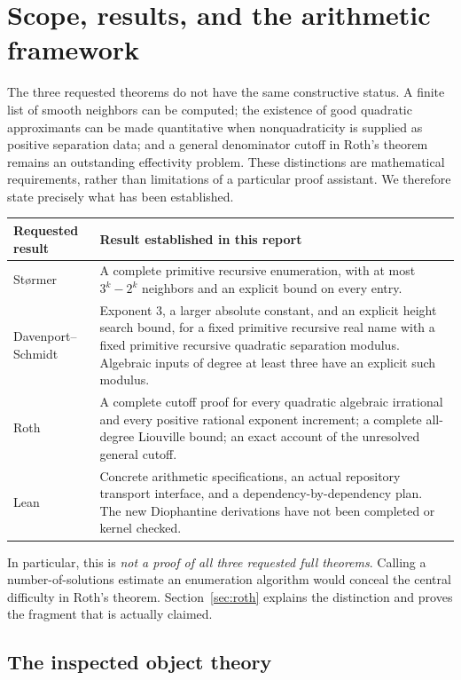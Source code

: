 \section{Scope, results, and the arithmetic framework}
\label{sec:framework}

The three requested theorems do not have the same constructive status.  A
finite list of smooth neighbors can be computed; the existence of good
quadratic approximants can be made quantitative when nonquadraticity is
supplied as positive separation data; and a general denominator cutoff in
Roth's theorem remains an outstanding effectivity problem.  These distinctions
are mathematical requirements, rather than limitations of a particular proof
assistant.  We therefore state precisely what has been established.

\begin{center}
\begin{tabularx}{\textwidth}{@{}p{}X@{}}
\toprule
Requested result & Result established in this report\\
\midrule
St\o rmer & A complete primitive recursive enumeration, with at most
$3^k-2^k$ neighbors and an explicit bound on every entry.\\[3pt]
Davenport--Schmidt & Exponent $3$, a larger absolute constant, and an
explicit height search bound, for a fixed primitive recursive real name
with a fixed primitive recursive quadratic separation modulus.
Algebraic inputs of degree at least three have an explicit such modulus.\\[3pt]
Roth & A complete cutoff proof for every quadratic algebraic irrational
and every positive rational exponent increment; a complete all-degree
Liouville bound; an exact account of the unresolved general cutoff.\\[3pt]
Lean & Concrete arithmetic specifications, an actual repository transport
interface, and a dependency-by-dependency plan.  The new Diophantine
derivations have not been completed or kernel checked.\\
\bottomrule
\end{tabularx}
\end{center}

In particular, this is \emph{not a proof of all three requested full theorems}.
Calling a number-of-solutions estimate an enumeration algorithm would conceal
the central difficulty in Roth's theorem.  Section~\ref{sec:roth} explains the
distinction and proves the fragment that is actually claimed.

\subsection{The inspected object theory}

